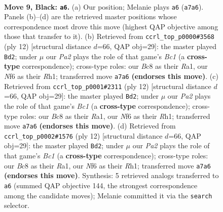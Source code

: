 \documentclass[11pt]{article}
\begin{document}
\clearpage

\begin{figure}[p]\centering
\begin{subfigure}{0.46\textwidth}\centering
\resizebox{\linewidth}{!}{%
\newchessgame
\chessboard[
  setfen={rnb2rk1/pp3ppp/4pn2/3q4/1b6/2NBPN2/PP3PPP/R1BQK2R b KQ - 1 9},
  showmover=false,
  pgfstyle=straightmove, color=movearrow, markmove={a7-a6}
]}
\caption{}
\end{subfigure}\hfill
\begin{subfigure}{0.46\textwidth}\centering
\resizebox{\linewidth}{!}{%
\newchessgame
\chessboard[
  setfen={r1bqk2r/ppp2ppp/2n1pn2/8/QbpP4/5NP1/PP2PPBP/RNB1K2R w KQkq - 4 7},
  showmover=false,
  pgfstyle=straightmove, color=movearrow, markmove={c1-d2}
]}
\caption{}
\end{subfigure}
\\[4pt]
\begin{subfigure}{0.46\textwidth}\centering
\resizebox{\linewidth}{!}{%
\newchessgame
\chessboard[
  setfen={r1bqk2r/ppp2ppp/2n1pn2/8/QbpP4/5NP1/PP2PPBP/RNB1K2R w KQkq - 4 7},
  showmover=false,
  pgfstyle=straightmove, color=movearrow, markmove={c1-d2}
]}
\caption{}
\end{subfigure}\hfill
\begin{subfigure}{0.46\textwidth}\centering
\resizebox{\linewidth}{!}{%
\newchessgame
\chessboard[
  setfen={r1bqk2r/ppp2ppp/2n1pn2/8/QbpP4/5NP1/PP2PPBP/RNB1K2R w KQkq - 4 7},
  showmover=false,
  pgfstyle=straightmove, color=movearrow, markmove={c1-d2}
]}
\caption{}
\end{subfigure}
\caption{\textbf{Move 9, Black: \texttt{a6}.} (a) Our position; Melanie plays \texttt{a6} (\texttt{a7a6}). Panels (b)--(d) are the retrieved master positions whose correspondence most drove this move (highest QAP objective among those that transfer to it). (b) Retrieved from \texttt{ccrl\_top\_p0000\#3568} (ply 12) [structural distance $d$=66, QAP obj=29]: the master played \texttt{Bd2}; under $\mu$ our \emph{Pa2} plays the role of that game's \emph{Bc1} (a \textbf{cross-type} correspondence); cross-type roles: our \emph{B}c8 as their \emph{R}a1, our \emph{N}f6 as their \emph{R}h1; transferred move \texttt{a7a6} \textbf{(endorses this move)}. (c) Retrieved from \texttt{ccrl\_top\_p0001\#2311} (ply 12) [structural distance $d$=66, QAP obj=29]: the master played \texttt{Bd2}; under $\mu$ our \emph{Pa2} plays the role of that game's \emph{Bc1} (a \textbf{cross-type} correspondence); cross-type roles: our \emph{B}c8 as their \emph{R}a1, our \emph{N}f6 as their \emph{R}h1; transferred move \texttt{a7a6} \textbf{(endorses this move)}. (d) Retrieved from \texttt{ccrl\_top\_p0002\#1576} (ply 12) [structural distance $d$=66, QAP obj=29]: the master played \texttt{Bd2}; under $\mu$ our \emph{Pa2} plays the role of that game's \emph{Bc1} (a \textbf{cross-type} correspondence); cross-type roles: our \emph{B}c8 as their \emph{R}a1, our \emph{N}f6 as their \emph{R}h1; transferred move \texttt{a7a6} \textbf{(endorses this move)}. Synthesis: 5 retrieved analogs transferred to \texttt{a6} (summed QAP objective 144, the strongest correspondence among the candidate moves); Melanie committed it via the \texttt{search} selector.}
\label{fig:thought-m17}
\end{figure}
\end{document}
